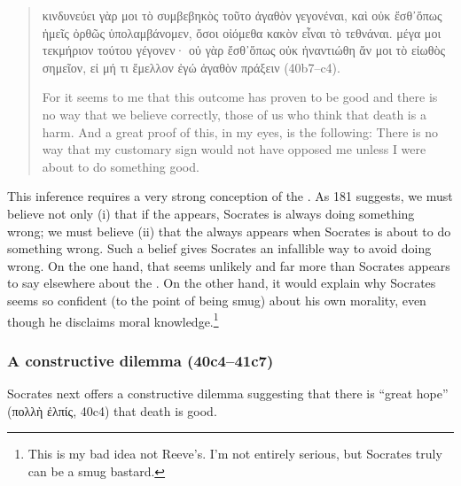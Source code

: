 \documentclass[11pt]{article}
\begin{document}
\begin{quote}

    {\g
    κινδυνεύει γὰρ μοι τὸ συμβεβηκὸς τοῦτο ἀγαθὸν γεγονέναι, καὶ οὐκ ἔσθ᾽ὅπως ἡμεῖς ὀρθῶς ὑπολαμβάνομεν, ὅσοι οἰόμεθα κακὸν εἶναι τὸ τεθνάναι.  μέγα μοι τεκμήριον τούτου γέγονεν· οὐ γὰρ ἔσθ᾽ὅπως οὐκ ἠναντιώθη ἄν μοι τὸ εἰωθὸς σημεῖον, εἰ μή τι ἔμελλον ἐγώ ἀγαθὸν πράξειν
    } (40b7--c4).

    For it seems to me that this outcome has proven to be good and there is no way that we believe correctly, those of us who think that death is a harm.  And a great proof of this, in my eyes, is the following: There is no way that my customary sign would not have opposed me unless I were about to do something good.

\end{quote}

This inference requires a very strong conception of the .  As \citet{reeve1989} 181 suggests, we must believe not only (i) that if the  appears, Socrates is always doing something wrong; we must believe (ii) that the  always appears when Socrates is about to do something wrong.  Such a belief gives Socrates an infallible way to avoid doing wrong.  On the one hand, that seems unlikely and far more than Socrates appears to say elsewhere about the .  On the other hand, it would explain why Socrates seems so confident (to the point of being smug) about his own morality, even though he disclaims moral knowledge.\footnote{This is my bad idea not Reeve's.  I'm not entirely serious, but Socrates truly can be a smug bastard.}


\subsubsection{A constructive dilemma (40c4--41c7)}

Socrates next offers a constructive dilemma suggesting that there is ``great hope'' ({\g πολλὴ ἐλπίς}, 40c4) that death is good.
\end{document}
